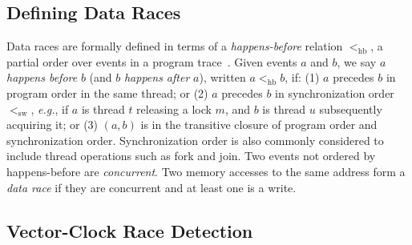 \documentclass[preprint, 10pt]{sigplanconf}
\newcommand{\eg}{\textit{e.g.}\xspace}
\newcommand{\hb}[0]{<_{\mathrm{hb}}}
\newcommand{\sw}[0]{<_{\mathrm{sw}}}
\newcommand{\Tid}{t}
\newcommand{\TidU}{u}
\newcommand{\Lock}{m}
\begin{document}

\subsection{Defining Data Races}
Data races are formally defined in terms of a \emph{happens-before} relation $\hb$, a partial order over events in a
program trace~\cite{lamporthb}.  Given events $a$ and $b$, we say $a$
\emph{happens before} $b$ (and $b$ \emph{happens after} $a$), written $a \hb b$,
if: (1) $a$ precedes $b$ in program order in the same thread; or (2) $a$
precedes $b$ in synchronization order $\sw$, \eg, if $a$ is thread $\Tid$ releasing a lock $\Lock$, and $b$ is thread $\TidU$ subsequently acquiring it; or (3) $(a,b)$ is in the
transitive closure of program order and synchronization order.
Synchronization order is also commonly considered to include thread operations such as fork and join.
Two events not ordered by happens-before are \emph{concurrent}.  Two
memory accesses to the same address form a \emph{data race} if they are
concurrent and at least one is a write.

\subsection{Vector-Clock Race Detection}
\label{vector-clocks}


\newcommand{\bigcell}[2][c]{%
  \begin{tabular}[#1]{@{}c@{}}#2\end{tabular}}
\end{document}
